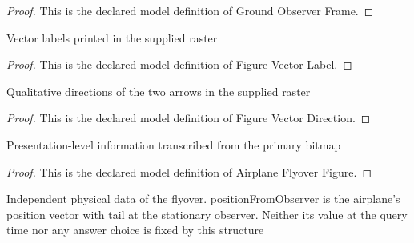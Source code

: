 \begin{proof}
  This is the declared model definition of Ground Observer Frame.
\end{proof}
\begin{definition}
  \label{def:physics:phyx-mini-0679:phyxminiproblems-problemphyxmini0679-figurevectorlabel}
  Vector labels printed in the supplied raster
\end{definition}
\begin{proof}
  This is the declared model definition of Figure Vector Label.
\end{proof}
\begin{definition}
  \label{def:physics:phyx-mini-0679:phyxminiproblems-problemphyxmini0679-figurevectordirection}
  Qualitative directions of the two arrows in the supplied raster
\end{definition}
\begin{proof}
  This is the declared model definition of Figure Vector Direction.
\end{proof}
\begin{definition}
  \label{def:physics:phyx-mini-0679:phyxminiproblems-problemphyxmini0679-airplaneflyoverfigure}
  Presentation-level information transcribed from the primary bitmap
\end{definition}
\begin{proof}
  This is the declared model definition of Airplane Flyover Figure.
\end{proof}
\begin{definition}
  \label{def:physics:phyx-mini-0679:phyxminiproblems-problemphyxmini0679-airplaneflyoversetup}
  Independent physical data of the flyover. positionFromObserver is the airplane's position vector with tail at the stationary observer. Neither its value at the query time nor any answer choice is fixed by this structure
\end{definition}
